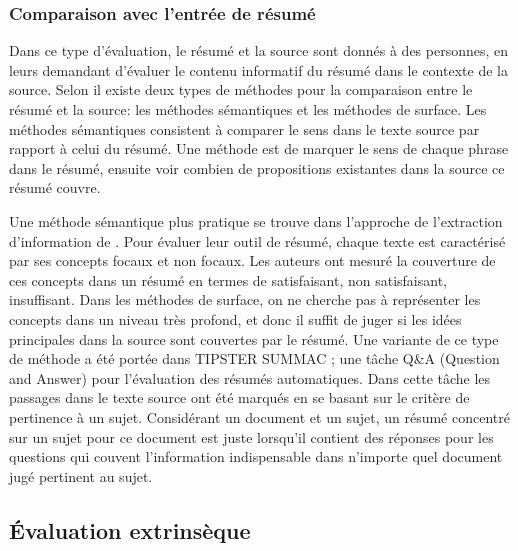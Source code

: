 \documentclass[a4paper,12pt,oneside]{../use/ESIthesis}
\begin{document}
\subsubsection{Comparaison avec l'entrée de résumé}

Dans ce type d'évaluation, le résumé et la source sont donnés à des personnes, en leurs demandant d'évaluer le contenu informatif du résumé dans le contexte de la source.
Selon \cite{01-mani} il existe deux types de méthodes pour la comparaison entre le résumé et la source: les méthodes sémantiques et les méthodes de surface.
Les méthodes sémantiques consistent à comparer le sens dans le texte source par rapport à celui du résumé. 
Une méthode est de marquer le sens de chaque phrase dans le résumé, ensuite voir combien de propositions existantes dans la source ce résumé couvre. 

Une méthode sémantique plus pratique se trouve dans l'approche de l'extraction d'information de \cite{93-paice-jones}. 
Pour évaluer leur outil de résumé, chaque texte est caractérisé par ses concepts focaux et non focaux. 
Les auteurs ont mesuré la couverture de ces concepts dans un résumé en termes de satisfaisant, non satisfaisant, insuffisant.
Dans les méthodes de surface, on ne cherche pas à représenter les concepts dans un niveau très profond, et donc il suffit de juger si les idées principales dans la source sont couvertes par le résumé. 
Une variante de ce type de méthode a été portée dans TIPSTER SUMMAC \cite{99-mani-al}; une tâche Q\&A (Question and Answer) pour l'évaluation des résumés automatiques. 
Dans cette tâche les passages dans le texte source ont été marqués en se basant sur le critère de pertinence à un sujet. 
Considérant un document et un sujet, un résumé concentré sur un sujet pour ce document est juste lorsqu'il contient des réponses pour les questions qui couvent l'information indispensable dans n'importe quel document jugé pertinent au sujet.

\subsection{Évaluation extrinsèque}
\end{document}
